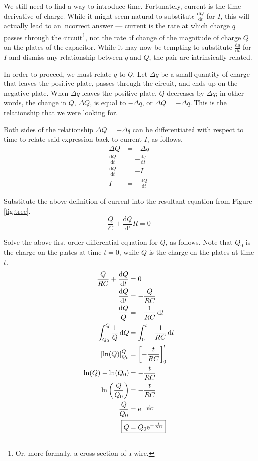 \documentclass{article}
\newcommand{\dd}[2][]{\frac{\text{d}#1}{\text{d}#2}}
\newcommand{\dQ}{\text{d}Q}
\newcommand{\dt}{\text{d}t}
\newcommand{\e}[1][]{\text{e}^{#1}}
\begin{document}
We still need to find a way to introduce time. Fortunately, current is the time derivative of charge. While it might seem natural to substitute $\dd[Q]{t}$ for $I$, this will actually lead to an incorrect answer --- current is the rate at which charge $q$ passes through the circuit\footnote{Or, more formally, a cross section of a wire.}, not the rate of change of the magnitude of charge $Q$ on the plates of the capacitor. While it may now be tempting to substitute $\dd[q]{t}$ for $I$ and dismiss any relationship between $q$ and $Q$, the pair are intrinsically related.\par
In order to proceed, we must relate $q$ to $Q$. Let $\Delta q$ be a small quantity of charge that leaves the positive plate, passes through the circuit, and ends up on the negative plate. When $\Delta q$ leaves the positive plate, $Q$ decreases by $\Delta q$; in other words, the change in $Q$, $\Delta Q$, is equal to $-\Delta q$, or $\Delta Q = -\Delta q$. This is the relationship that we were looking for.\par
Both sides of the relationship $\Delta Q=-\Delta q$ can be differentiated with respect to time to relate said expression back to current $I$, as follows.
\begin{align*}
    \Delta Q &= -\Delta q\\
    \dd[Q]{t} &= -\dd[q]{t}\\
    \dd[Q]{t} &= -I\\
    I &= -\dd[Q]{t}
\end{align*}\par
Substitute the above definition of current into the resultant equation from Figure \ref{fig:tree}.
\begin{equation*}
    \frac{Q}{C}+\dd[Q]{t}R=0
\end{equation*}\par
Solve the above first-order differential equation for $Q$, as follows. Note that $Q_0$ is the charge on the plates at time $t=0$, while $Q$ is the charge on the plates at time $t$.
\begin{align*}
    \frac{Q}{RC}+\dd[Q]{t} &= 0\\
    \dd[Q]{t} &= -\frac{Q}{RC}\\
    \frac{\dQ}{Q} &= -\frac{1}{RC}\, \dt\\
    \int_{Q_0}^Q \frac{1}{Q}\, \dQ &= \int_0^t -\frac{1}{RC}\, \dt\\
    \left[ \ln(Q) \right]_{Q_0}^Q &= \left[ -\frac{t}{RC} \right]_0^t\\
    \ln(Q)-\ln(Q_0) &= -\frac{t}{RC}\\
    \ln\left( \frac{Q}{Q_0} \right) &= -\frac{t}{RC}\\
    \frac{Q}{Q_0} &= \e[-\frac{t}{RC}]\\
    \Aboxed{Q &= Q_0\e[-\frac{t}{RC}]}
\end{align*}
\end{document}
